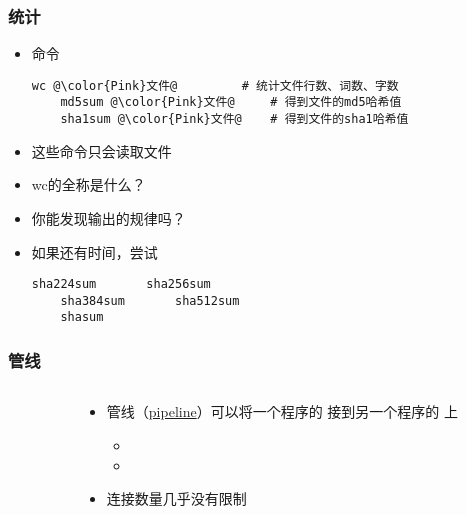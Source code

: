 \begin{frame} [fragile]
	\frametitle{统计}
	\linespread{1.25}
	\begin{itemize}
	\item 命令
	\begin{lstlisting}[style=bashstyle, gobble=4, texcl, escapechar=@]
	wc @\color{Pink}文件@			# 统计文件行数、词数、字数
	md5sum @\color{Pink}文件@		# 得到文件的md5哈希值
	sha1sum @\color{Pink}文件@	# 得到文件的sha1哈希值
	\end{lstlisting}
	\item 这些命令只会读取文件
	\item wc的全称是什么？
	\item 你能发现输出的规律吗？
	\item 如果还有时间，尝试
	\begin{lstlisting}[style=bashstyle, gobble=4, texcl, escapechar=@]
	sha224sum		sha256sum
	sha384sum		sha512sum
	shasum
	\end{lstlisting}
	\end{itemize}
\end{frame}

\begin{frame} [fragile]
	\frametitle{管线}
	\linespread{1.5}
	\begin{columns}[T]
		\begin{column}[T]{.5\textwidth}
			
		\end{column}
		\begin{column}[T]{.5\textwidth}
			\begin{itemize}
			\item 管线（\href{https://en.wikipedia.org/wiki/Pipeline\_(Unix)}
							{pipeline}）可以将一个程序的 
							接到另一个程序的  上
				\begin{itemize}
				\item {}
				\item {}
				\end{itemize}
			\item 连接数量几乎没有限制
			\end{itemize}
		\end{column}
	\end{columns}
\end{frame}

